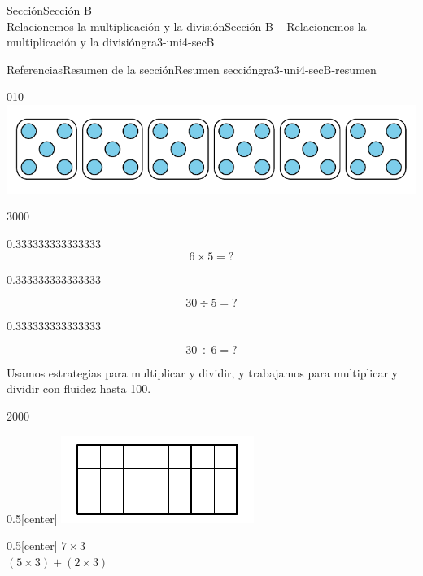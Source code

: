 \begin{sectionptx}{Sección}{{\Large Sección B\\}Relacionemos la multiplicación y la división}{}{Sección B -~Relacionemos la multiplicación y la división}{}{}{gra3-uni4-secB}
\begin{references-subsection}{Referencias}{Resumen de la sección}{}{Resumen sección}{}{}{gra3-uni4-secB-resumen}
\begin{image}{0}{1}{0}{}
\includegraphics[max width=\linewidth, center]{external/svg-source/tikz-file-176322.pdf}
\end{image}%
\begin{sidebyside}{3}{0}{0}{0}%
\begin{sbspanel}{0.333333333333333}%
%
\begin{equation*}
6\times 5={?}
\end{equation*}
%
\end{sbspanel}%
\begin{sbspanel}{0.333333333333333}%
\par
%
\begin{equation*}
30\div 5={?}
\end{equation*}
%
\end{sbspanel}%
\begin{sbspanel}{0.333333333333333}%
\par
%
\begin{equation*}
30\div 6={?}
\end{equation*}
%
\end{sbspanel}%
\end{sidebyside}%
\par
Usamos estrategias para multiplicar y dividir, y trabajamos para multiplicar y dividir con fluidez hasta 100.%
\begin{sidebyside}{2}{0}{0}{0}%
\begin{sbspanel}{0.5}[center]%
\includegraphics[max width=\linewidth, center]{external/svg-source/tikz-file-141807.pdf}
\end{sbspanel}%
\begin{sbspanel}{0.5}[center]%
\(7\times 3\)\\
 \((5\times3)+(2\times3)\)%
\end{sbspanel}%
\end{sidebyside}%
\end{references-subsection}
\end{sectionptx}
